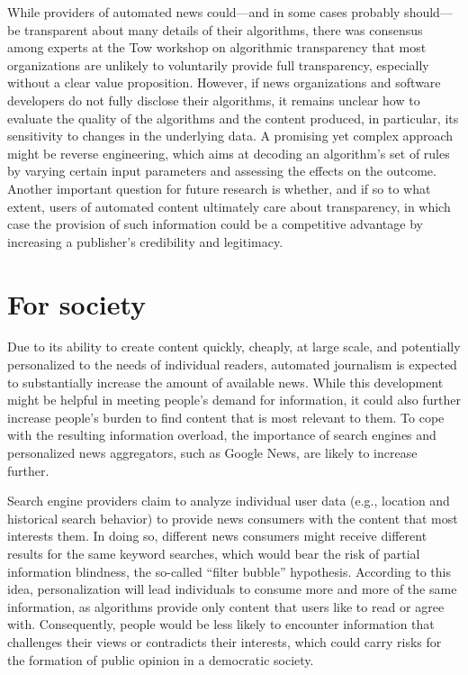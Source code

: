 \documentclass[notoc, symmetric, nobib, nols]{towcenter-book}
\begin{document}
While providers of automated news could---and in some cases probably should---be transparent about many details of their algorithms, there was consensus among experts at the Tow workshop on algorithmic transparency that most organizations are unlikely to voluntarily provide full transparency, especially without a clear value proposition. However, if news organizations and software developers do not fully disclose their algorithms, it remains unclear how to evaluate the quality of the algorithms and the content produced, in particular, its sensitivity to changes in the underlying data. A promising yet complex approach might be reverse engineering, which aims at decoding an algorithm’s set of rules by varying certain input parameters and assessing the effects on the outcome.\cite{diak152} Another important question for future research is whether, and if so to what extent, users of automated content ultimately care about transparency, in which case the provision of such information could be a competitive advantage by increasing a publisher’s credibility and legitimacy.\cite{diak15}

\section{For society}

Due to its ability to create content quickly, cheaply, at large scale, and potentially personalized to the needs of individual readers, automated journalism is expected to substantially increase the amount of available news. While this development might be helpful in meeting people’s demand for information, it could also further increase people’s burden to find content that is most relevant to them. To cope with the resulting information overload, the importance of search engines and personalized news aggregators, such as Google News, are likely to increase further. 

Search engine providers claim to analyze individual user data (e.g., location and historical search behavior) to provide news consumers with the content that most interests them. In doing so, different news consumers might receive different results for the same keyword searches, which would bear the risk of partial information blindness, the so-called ``filter bubble'' hypothesis.\cite{paris11} According to this idea, personalization will lead individuals to consume more and more of the same information, as algorithms provide only content that users like to read or agree with. Consequently, people would be less likely to encounter information that challenges their views or contradicts their interests, which could carry risks for the formation of public opinion in a democratic society. 
\end{document}
